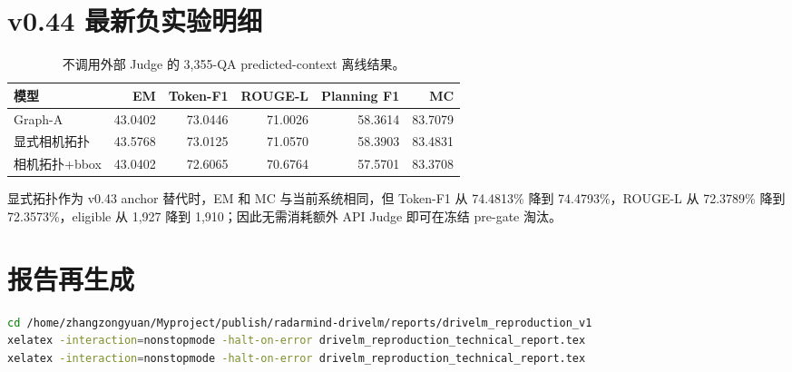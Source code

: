 \documentclass[UTF8,a4paper,11pt]{ctexart}
\begin{document}
\section{v0.44 最新负实验明细}
\begin{table}[H]
\centering
\caption{不调用外部 Judge 的 3,355-QA predicted-context 离线结果。}
\begin{tabular}{lrrrrr}
\toprule
模型 & EM & Token-F1 & ROUGE-L & Planning F1 & MC\\
\midrule
Graph-A & 43.0402 & 73.0446 & 71.0026 & 58.3614 & 83.7079\\
显式相机拓扑 & 43.5768 & 73.0125 & 71.0570 & 58.3903 & 83.4831\\
相机拓扑+bbox & 43.0402 & 72.6065 & 70.6764 & 57.5701 & 83.3708\\
\bottomrule
\end{tabular}
\end{table}

显式拓扑作为 v0.43 anchor 替代时，EM 和 MC 与当前系统相同，但 Token-F1 从 74.4813\% 降到 74.4793\%，ROUGE-L 从 72.3789\% 降到 72.3573\%，eligible 从 1,927 降到 1,910；因此无需消耗额外 API Judge 即可在冻结 pre-gate 淘汰。

\section{报告再生成}
\begin{lstlisting}[language=bash]
cd /home/zhangzongyuan/Myproject/publish/radarmind-drivelm/reports/drivelm_reproduction_v1
xelatex -interaction=nonstopmode -halt-on-error drivelm_reproduction_technical_report.tex
xelatex -interaction=nonstopmode -halt-on-error drivelm_reproduction_technical_report.tex
\end{lstlisting}
\end{document}

